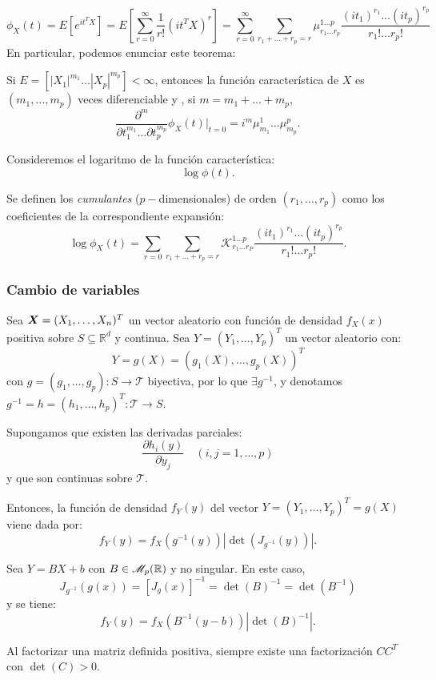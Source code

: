 \[
\phi_X(t) = E\left[e^{it^T X}\right] = E\left[\sum_{r=0}^\infty \frac{1}{r!}(i t^T X)^r\right] = \sum_{r= 0}^\infty \sum _{r_1+\dots + r_p = r} \mu_{r_1 \dots r_p}^{1 \dots p} \frac{(it_1)^{r_1} \dots (it_p)^{r_p}}{r_1 ! \dots r_p !}
\]
En particular, podemos enunciar este teorema:
\begin{nth}
  Si $E=\left[|X_1|^{m_1} \dots |X_p|^{m_p}\right] < \infty$, entonces la función característica de $X$ es $(m_1, \dots, m_p)$ veces diferenciable y , si $m = m_1 + \dots + m_p$,
  \[
\frac{\partial ^m}{\partial t_1^{m_1} \dots \partial t_p^{m_p}} \phi_X(t)| _{t = 0} = i^m \mu_{m_1}^1 \dots \mu_{m_p}^p
  .\]
\end{nth}

Consideremos el logaritmo de la función característica:
\[
\log \phi(t).
\]
\begin{ndef}
  Se definen los \emph{cumulantes} ($p-$dimensionales) de orden $(r_1 , \dots, r_p)$ como los coeficientes de la correspondiente expansión:
  \[
  \log \phi_X(t) =  \sum_{r= 0} \sum_{r_1+\dots + r_p = r} \mathcal K_{r_1 \dots r_P}^{1\dots p} \frac{(it_1)^{r_1} \dots (it_p)^{r_p}}{r_1 ! \dots r_p !}
  .\]
\end{ndef}


\subsubsection{Cambio de variables}

\begin{nth} \label{cambiovariablealeatoria}
  Sea $\boldsymbol{X} = (X_1,\dots,X_n)^T$ un vector aleatorio con función de densidad $f_X(x)$ positiva sobre $S \subseteq \mathbb R^d$ y continua. Sea $Y = (Y_1,\dots,Y_p)^T$ un vector aleatorio con:
  \[
  Y = g(X) = (g_1(X),\dots ,g_p(X))^T
  \]
  con $g = (g_1,\dots,g_p): S \to \mathcal T$ biyectiva, por lo que $\exists g^{-1}$, y denotamos $g^{-1} = h = (h_1,\dots, h_p)^T : \mathcal T \to S$.

  Supongamos que existen las derivadas parciales:
  \[
    \frac{\partial h_i(y)}{\partial y_j} \quad (i,j = 1,\dots,p)
  \]
  y que son continuas sobre $\mathcal T$.

  Entonces, la función de densidad $f_Y(y)$ del vector $Y=(Y_1,\dots,Y_p)^T = g(X)$ viene dada por:
  \[
  f_Y(y) = f_X(g^{-1}(y))\left|\det(J_{g^{-1}}(y))\right|
  .\]
\end{nth}

\begin{ncor} \label{cambiocasolineal}
  Sea $Y = BX + b$ con $B\in \mathscr{M}_{p}(\mathbb{R})$ y no singular. En este caso,
  \[
  J_{g^{-1}}(g(x)) = \left[ J_{g}(x) \right]^{-1} = \det(B)^{-1} = \det\left(B^{-1}\right)
  \]
  y se tiene:
  \[
  f_Y(y) = f_X\left(B^{-1}(y-b)\right)\left|\det(B)^{-1}\right|
  .\]

\end{ncor}
\begin{nota}
  Al factorizar una matriz definida positiva, siempre existe una factorización $CC^T$ con $\det(C) > 0$.
  \end{nota}

